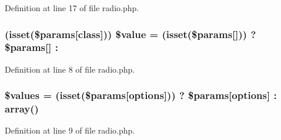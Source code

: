 Definition at line 17 of file radio.\+php.

\subsubsection[{\texorpdfstring{\$value}{$value}}]{ (isset(\$params\mbox{[}\textquotesingle{}class\textquotesingle{}\mbox{]})) \${\bf value} = (isset(\$params\mbox{[}\textquotesingle{}\mbox{]})) ? \$params\mbox{[}\textquotesingle{}\mbox{]} \+: \textquotesingle{}\textquotesingle{}}\hypertarget{radio_8php_a5bd63f8afd4dd4ba86dcdf5618904298}{}\label{radio_8php_a5bd63f8afd4dd4ba86dcdf5618904298}


Definition at line 8 of file radio.\+php.

\subsubsection[{\texorpdfstring{\$values}{$values}}]{\setlength{\rightskip}{0pt plus 5cm}\$values = (isset(\$params\mbox{[}\textquotesingle{}options\textquotesingle{}\mbox{]})) ? \$params\mbox{[}\textquotesingle{}options\textquotesingle{}\mbox{]} \+: array()}\hypertarget{radio_8php_affc45c6ace2eeb3f300b054dbf9592b6}{}\label{radio_8php_affc45c6ace2eeb3f300b054dbf9592b6}


Definition at line 9 of file radio.\+php.

